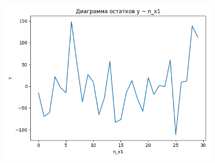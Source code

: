 \begin{figure}[H]
\begin{minipage}[H]{0.32\linewidth}
\begin{center}
		\end{center}
	\end{minipage}
	\hfill
	\begin{minipage}[H]{0.32\linewidth}
		\begin{center}
			\includegraphics[width=\linewidth]{figures/res_plot_n_x1}
		\end{center}
	\end{minipage}
\end{figure}

